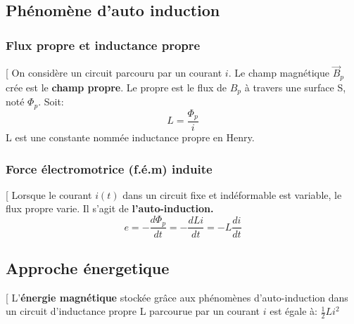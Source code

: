 \documentclass[12pt,hidelinks]{article}
\begin{document}
        \subsection{Phénomène d'auto induction}
            \subsubsection{Flux propre et inductance propre}
                \begin{DashedDefinition}{}[
                On considère un circuit parcouru par un courant $i$.  Le champ magnétique $\vec B_p$ crée est le \textbf{champ propre}. Le propre est le flux de $B_p$ à travers une surface S, noté $\Phi_p$. Soit:
                \[L=\frac{\Phi_p}{i}\]
                L est une constante nommée inductance propre en Henry.
                \end{DashedDefinition}
            \subsubsection{Force électromotrice (f.é.m) induite}
                \begin{DashedDefinition}{}[
                Lorsque le courant $i(t)$ dans un circuit fixe et indéformable est variable, le flux propre varie. Il s'agit de \textbf{l'auto-induction.}
                \[e=-\frac{d \Phi_p}{dt} = -\frac{dLi}{dt} = -L \frac{di}{dt}\]
                \end{DashedDefinition}
            \subsection{Approche énergetique}
                \begin{DashedDefinition}{}[
                L'\textbf{énergie magnétique} stockée grâce aux phénomènes d'auto-induction dans un circuit d'inductance propre L parcourue par un courant $i$ est égale à: $\frac{1}{2} L i^2$
                \end{DashedDefinition}
\end{document}
